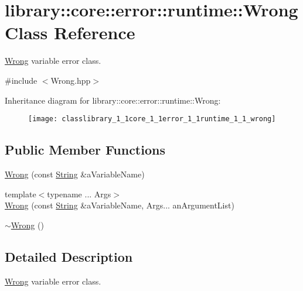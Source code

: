 \hypertarget{classlibrary_1_1core_1_1error_1_1runtime_1_1_wrong}{}\section{library\+:\+:core\+:\+:error\+:\+:runtime\+:\+:Wrong Class Reference}
\label{classlibrary_1_1core_1_1error_1_1runtime_1_1_wrong}


\hyperlink{classlibrary_1_1core_1_1error_1_1runtime_1_1_wrong}{Wrong} variable error class.  




{\ttfamily \#include $<$Wrong.\+hpp$>$}

Inheritance diagram for library\+:\+:core\+:\+:error\+:\+:runtime\+:\+:Wrong\+:\begin{figure}[H]
\begin{center}
\leavevmode
\texttt{[image: classlibrary\_1\_1core\_1\_1error\_1\_1runtime\_1\_1\_wrong]}
\end{center}
\end{figure}
\subsection*{Public Member Functions}
\begin{DoxyCompactItemize}
\item 
\hyperlink{classlibrary_1_1core_1_1error_1_1runtime_1_1_wrong_acb341a0822b64bfa2d8cdf7963b24f96}{Wrong} (const \hyperlink{classlibrary_1_1core_1_1types_1_1_string}{String} \&a\+Variable\+Name)
\item 
{\footnotesize template$<$typename ... Args$>$ }\\\hyperlink{classlibrary_1_1core_1_1error_1_1runtime_1_1_wrong_a136f670283ce244b5db8be988db73a73}{Wrong} (const \hyperlink{classlibrary_1_1core_1_1types_1_1_string}{String} \&a\+Variable\+Name, Args... an\+Argument\+List)
\item 
\hyperlink{classlibrary_1_1core_1_1error_1_1runtime_1_1_wrong_a6cdcfe31f32807b295695b9bd288d1cf}{$\sim$\+Wrong} ()
\end{DoxyCompactItemize}


\subsection{Detailed Description}
\hyperlink{classlibrary_1_1core_1_1error_1_1runtime_1_1_wrong}{Wrong} variable error class. 

